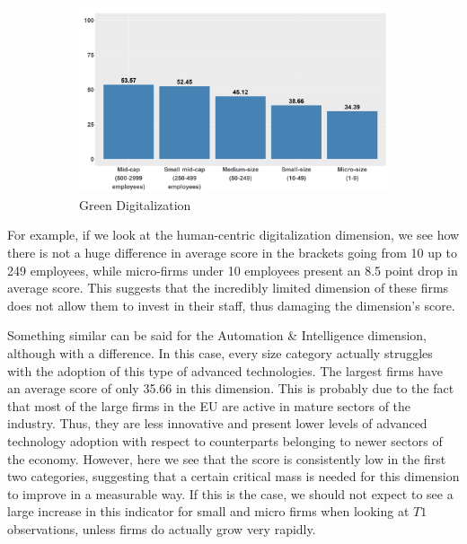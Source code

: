 \documentclass[12pt]{report}
\begin{document}
\begin{figure}[p]
\begin{subfigure}[b]{0.48\textwidth}
        \includegraphics[width=\linewidth]{../Output/avg_dmascore_by_size_green_dig.png}
        \caption{Green Digitalization}
        \label{fig:dma_size_green_digitalization}
    \end{subfigure}
    \caption{}
    \label{fig:dma_size_all}
\end{figure}


\par For example, if we look at the human-centric digitalization dimension, we see how there is not a huge difference in average score in the brackets going from 10 up to 249 employees, while micro-firms under 10 employees present an 8.5 point drop in average score. This suggests that the incredibly limited dimension of these firms does not allow them to invest in their staff, thus damaging the dimension's score.


\par Something similar can be said for the Automation \& Intelligence dimension, although with a difference. In this case, every size category actually struggles with the adoption of this type of advanced technologies. The largest firms have an average score of only 35.66 in this dimension. This is probably due to the fact that most of the large firms in the EU are active in mature sectors of the industry. Thus, they are less innovative and present lower levels of advanced technology adoption with respect to counterparts belonging to newer sectors of the economy. However, here we see that the score is consistently low in the first two categories, suggesting that a certain critical mass is needed for this dimension to improve in a measurable way. If this is the case, we should not expect to see a large increase in this indicator for small and micro firms when looking at $T1$ observations, unless firms do actually grow very rapidly.
\end{document}
